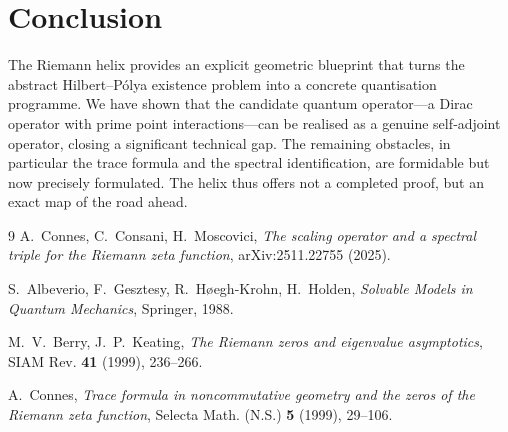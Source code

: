 \documentclass[12pt,a4paper]{article}
\begin{document}
\section{Conclusion}

The Riemann helix provides an explicit geometric blueprint that turns the abstract Hilbert–Pólya existence problem into a concrete quantisation programme.  We have shown that the candidate quantum operator—a Dirac operator with prime point interactions—can be realised as a genuine self‑adjoint operator, closing a significant technical gap.  The remaining obstacles, in particular the trace formula and the spectral identification, are formidable but now precisely formulated.  The helix thus offers not a completed proof, but an exact map of the road ahead.

\begin{thebibliography}{9}
A.~Connes, C.~Consani, H.~Moscovici,
\emph{The scaling operator and a spectral triple for the Riemann zeta function},
arXiv:2511.22755 (2025).

S.~Albeverio, F.~Gesztesy, R.~H{\o}egh-Krohn, H.~Holden,
\emph{Solvable Models in Quantum Mechanics},
Springer, 1988.

M.~V.~Berry, J.~P.~Keating,
\emph{The Riemann zeros and eigenvalue asymptotics},
SIAM Rev. \textbf{41} (1999), 236--266.

A.~Connes,
\emph{Trace formula in noncommutative geometry and the zeros of the Riemann zeta function},
Selecta Math. (N.S.) \textbf{5} (1999), 29--106.
\end{thebibliography}
\end{document}
